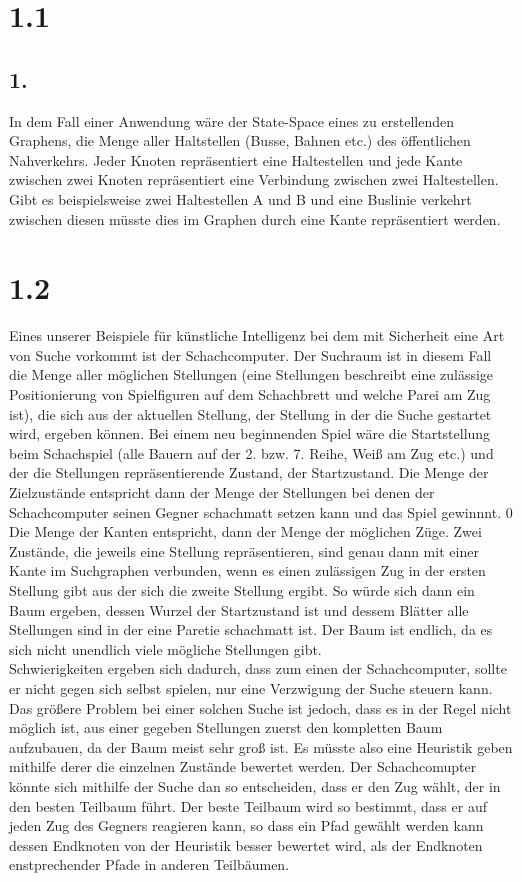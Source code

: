 \documentclass[a4paper,11pt,fleqn]{scrartcl}
\title{\titleinfo}
\author{\authorinfo}
\begin{document}
\maketitle

\section*{1.1}
\subsection*{1.}
In dem Fall einer Anwendung wäre der State-Space eines zu erstellenden Graphens, die Menge aller Haltstellen (Busse, Bahnen etc.) des öffentlichen Nahverkehrs. Jeder Knoten repräsentiert eine Haltestellen und jede Kante zwischen zwei Knoten repräsentiert eine Verbindung zwischen zwei Haltestellen. Gibt es beispielsweise zwei Haltestellen A und B und eine Buslinie verkehrt zwischen diesen müsste dies im Graphen durch eine Kante repräsentiert werden.  
\section*{1.2}
Eines unserer Beispiele für künstliche Intelligenz bei dem mit Sicherheit eine Art von Suche vorkommt ist der Schachcomputer. Der Suchraum ist in diesem Fall die Menge aller möglichen Stellungen (eine Stellungen beschreibt eine zulässige Positionierung von Spielfiguren auf dem Schachbrett und welche Parei am Zug ist), die sich aus der aktuellen Stellung, der Stellung in der die Suche gestartet wird, ergeben können. 
Bei einem neu beginnenden Spiel wäre die Startstellung beim Schachspiel (alle Bauern auf der 2. bzw. 7. Reihe, Weiß am Zug etc.) und der die Stellungen repräsentierende Zustand, der Startzustand. Die Menge der Zielzustände entspricht dann der Menge der Stellungen bei denen der Schachcomputer seinen Gegner schachmatt setzen kann und das Spiel gewinnnt. 0
Die Menge der Kanten entspricht, dann der Menge der möglichen Züge. Zwei Zustände, die jeweils eine Stellung repräsentieren, sind genau dann mit einer Kante im Suchgraphen verbunden, wenn es einen zulässigen Zug in der ersten Stellung gibt aus der sich die zweite Stellung ergibt. So würde sich dann ein Baum ergeben, dessen Wurzel der Startzustand ist und dessem Blätter alle Stellungen sind in der eine Paretie schachmatt ist. Der Baum ist endlich, da es sich nicht unendlich viele mögliche Stellungen gibt.\\
Schwierigkeiten ergeben sich dadurch, dass zum einen der Schachcomputer, sollte er nicht gegen sich selbst spielen, nur eine Verzwigung der Suche steuern kann. Das größere Problem bei einer solchen Suche ist jedoch, dass es in der Regel nicht möglich ist, aus einer gegeben Stellungen zuerst den kompletten Baum aufzubauen, da der Baum meist sehr groß ist. Es müsste also eine Heuristik geben mithilfe derer die einzelnen Zustände bewertet werden. Der Schachcomupter könnte sich mithilfe der Suche dan so entscheiden, dass er den Zug wählt, der in den besten Teilbaum führt. Der beste Teilbaum wird so bestimmt, dass er auf jeden Zug des Gegners reagieren kann, so dass ein Pfad gewählt werden kann dessen Endknoten von der Heuristik besser bewertet wird, als der Endknoten enstprechender Pfade in anderen Teilbäumen.
\end{document}
